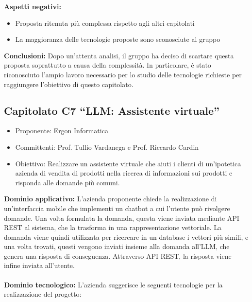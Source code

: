 \documentclass[10pt]{article}
\begin{document}
\textbf{Aspetti negativi:}
\begin{itemize}
    \item Proposta ritenuta più complessa rispetto agli altri capitolati
    \item La maggioranza delle tecnologie proposte sono sconosciute al gruppo
\end{itemize}
\textbf{Conclusioni:}
Dopo un'attenta analisi, il gruppo ha deciso di scartare questa proposta soprattutto a causa della complessità. In particolare, è stato riconosciuto l’ampio lavoro necessario per lo studio delle tecnologie richieste per raggiungere l’obiettivo di questo capitolato.

\subsection{Capitolato C7 “LLM: Assistente virtuale”}
\begin{itemize}
    \item Proponente: Ergon Informatica
    \item Committenti: Prof. Tullio Vardanega e Prof. Riccardo Cardin
    \item Obiettivo: Realizzare un assistente virtuale che aiuti i clienti di un’ipotetica azienda di vendita di prodotti nella ricerca di informazioni sui prodotti e risponda alle domande più comuni.
\end{itemize}
\textbf{Dominio applicativo:}
L’azienda proponente chiede la realizzazione di un’interfaccia mobile che implementi un chatbot a cui l’utente può rivolgere domande. Una volta formulata la domanda, questa viene inviata mediante API REST al sistema, che la trasforma in una rappresentazione vettoriale. La domanda viene quindi utilizzata per ricercare in un database i vettori più simili, e una volta trovati, questi vengono inviati insieme alla domanda all’LLM, che genera una risposta di conseguenza. Attraverso API REST, la risposta viene infine inviata all’utente.\\
\\
\textbf{Dominio tecnologico:} L'azienda suggerisce le seguenti tecnologie per la realizzazione del progetto:
\end{document}
